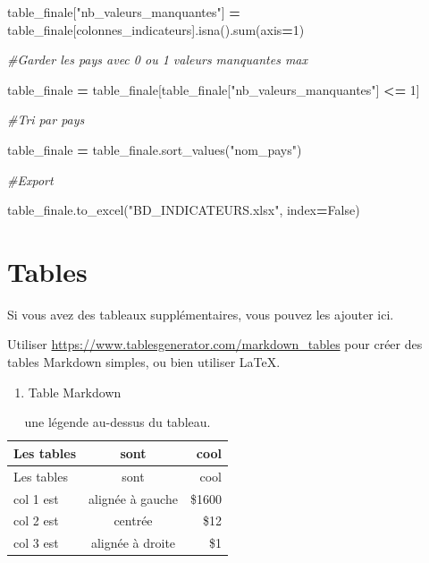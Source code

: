 \documentclass[mstat,12pt]{unswthesis}
\newenvironment{Shaded}{\begin{snugshade}}{\end{snugshade}}
\newcommand{\BuiltInTok}[1]{#1}
\newcommand{\CommentTok}[1]{\textcolor[rgb]{0.56,0.35,0.01}{\textit{#1}}}
\newcommand{\DecValTok}[1]{\textcolor[rgb]{0.00,0.00,0.81}{#1}}
\newcommand{\NormalTok}[1]{#1}
\newcommand{\OperatorTok}[1]{\textcolor[rgb]{0.81,0.36,0.00}{\textbf{#1}}}
\newcommand{\StringTok}[1]{\textcolor[rgb]{0.31,0.60,0.02}{#1}}
\newcommand{\VariableTok}[1]{\textcolor[rgb]{0.00,0.00,0.00}{#1}}
\begin{document}
\begin{Shaded}
\begin{Highlighting}[]
\NormalTok{table\_finale[}\StringTok{"nb\_valeurs\_manquantes"}\NormalTok{] }\OperatorTok{=}\NormalTok{ table\_finale[colonnes\_indicateurs].isna().}\BuiltInTok{sum}\NormalTok{(axis}\OperatorTok{=}\DecValTok{1}\NormalTok{)}

\CommentTok{\#Garder les pays avec 0 ou 1 valeurs manquantes max}

\NormalTok{table\_finale }\OperatorTok{=}\NormalTok{ table\_finale[table\_finale[}\StringTok{"nb\_valeurs\_manquantes"}\NormalTok{] }\OperatorTok{\textless{}=} \DecValTok{1}\NormalTok{]}

\CommentTok{\#Tri par pays}

\NormalTok{table\_finale }\OperatorTok{=}\NormalTok{ table\_finale.sort\_values(}\StringTok{"nom\_pays"}\NormalTok{)}

\CommentTok{\#Export}

\NormalTok{table\_finale.to\_excel(}\StringTok{"BD\_INDICATEURS.xlsx"}\NormalTok{, index}\OperatorTok{=}\VariableTok{False}\NormalTok{)}
\end{Highlighting}
\end{Shaded}

\section*{\texorpdfstring{\textbf{Tables}}{Tables}}\label{tables}

Si vous avez des tableaux supplémentaires, vous pouvez les ajouter ici.

Utiliser \url{https://www.tablesgenerator.com/markdown_tables} pour
créer des tables Markdown simples, ou bien utiliser \LaTeX.

\begin{enumerate}
\def\labelenumi{\arabic{enumi}.}
\tightlist
\item
  Table Markdown
\end{enumerate}

\begin{longtable}[]{@{}lcr@{}}
\caption{une légende au-dessus du tableau.
\label{tab7.1}}\tabularnewline
\toprule\noalign{}
Les tables & sont & cool \\
\midrule\noalign{}
\endfirsthead
\toprule\noalign{}
Les tables & sont & cool \\
\midrule\noalign{}
\endhead
\bottomrule\noalign{}
\endlastfoot
col 1 est & alignée à gauche & \$1600 \\
col 2 est & centrée & \$12 \\
col 3 est & alignée à droite & \$1 \\
\end{longtable}
\end{document}
